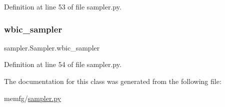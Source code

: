 Definition at line 53 of file sampler.\+py.

\mbox{\label{classsampler_1_1Sampler_a8476d0b5a5f4f22edef248b2f0930c6a}} 
\subsubsection{\texorpdfstring{wbic\+\_\+sampler}{wbic\_sampler}}
{\footnotesize\ttfamily sampler.\+Sampler.\+wbic\+\_\+sampler}



Definition at line 54 of file sampler.\+py.



The documentation for this class was generated from the following file\+:\begin{DoxyCompactItemize}
\item 
memfg/\hyperlink{sampler_8py}{sampler.\+py}\end{DoxyCompactItemize}
